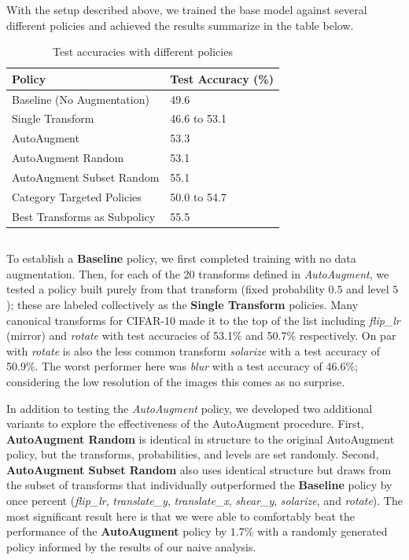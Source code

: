 \documentclass[10pt,twocolumn,letterpaper]{article}
\begin{document}
		With the setup described above, we trained the base model against several different policies and achieved the results summarize in the table below.

		\begin{table}[h]
			\begin{tabular}{l|l}
				\hline
				Policy  						&Test Accuracy (\%)   \\ \hline
				Baseline (No Augmentation)  	&49.6 \\
				Single Transform				&46.6 to 53.1 \\
				AutoAugment 					&53.3 \\ 
				AutoAugment Random				&53.1 \\	
				AutoAugment Subset Random 		&55.1 \\
				Category Targeted Policies   	&50.0 to 54.7 \\
				Best Transforms as Subpolicy 	&55.5
			\end{tabular}
			\caption{Test accuracies with different policies}
		\end{table}



	\subsection{}

		To establish a \textbf{Baseline} policy, we first completed training with no data augmentation. Then, for each of the 20 transforms defined in \textit{AutoAugment}, we tested a policy built purely from that transform (fixed probability $0.5$ and level $5$); these are labeled collectively as the \textbf{Single Transform} policies. Many canonical transforms for CIFAR-10 made it to the top of the list including \textit{flip\_lr} (mirror) and \textit{rotate} with test accuracies of 53.1\% and 50.7\% respectively. On par with \textit{rotate} is also the less common transform \textit{solarize} with a test accuracy of 50.9\%. The worst performer here was \textit{blur} with a test accuracy of 46.6\%; considering the low resolution of the images this comes as no surprise.

		In addition to testing the \textit{AutoAugment} policy, we developed two additional variants to explore the effectiveness of the AutoAugment procedure. First, \textbf{AutoAugment Random} is identical in structure to the original AutoAugment policy, but the transforms, probabilities, and levels are set randomly. Second, \textbf{AutoAugment Subset Random} also uses identical structure but draws from the subset of transforms that individually outperformed the \textbf{Baseline} policy by once percent (\textit{flip\_lr}, \textit{translate\_y}, \textit{translate\_x}, \textit{shear\_y}, \textit{solarize}, and \textit{rotate}). The most significant result here is that we were able to comfortably beat the performance of the \textbf{AutoAugment} policy by $1.7\%$ with a randomly generated policy informed by the results of our naive analysis.
\end{document}
